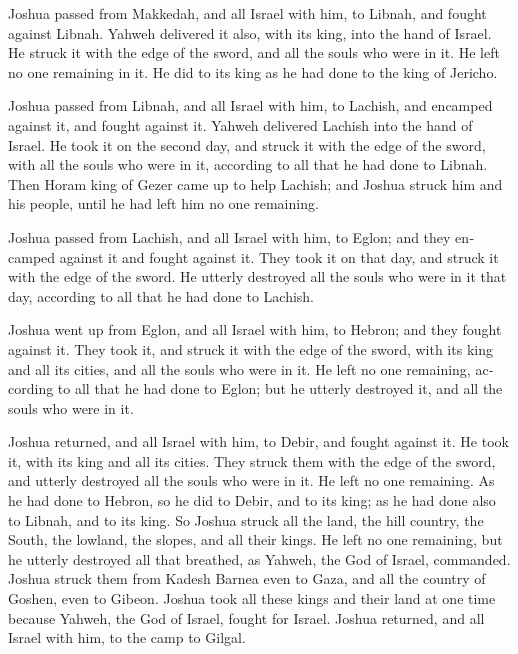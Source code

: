 \begin{paracol}{2}
\begin{otherlanguage}{english}
 Joshua passed from Makkedah, and all Israel with him, to
Libnah, and fought against Libnah.  Yahweh delivered it
also, with its king, into the hand of Israel. He struck it with the edge
of the sword, and all the souls who were in it. He left no one remaining
in it. He did to its king as he had done to the king of Jericho.

 Joshua passed from Libnah, and all Israel with him, to
Lachish, and encamped against it, and fought against it. 
Yahweh delivered Lachish into the hand of Israel. He took it on the
second day, and struck it with the edge of the sword, with all the souls
who were in it, according to all that he had done to Libnah.
 Then Horam king of Gezer came up to help Lachish; and
Joshua struck him and his people, until he had left him no one
remaining.

 Joshua passed from Lachish, and all Israel with him, to
Eglon; and they encamped against it and fought against it.
 They took it on that day, and struck it with the edge of
the sword. He utterly destroyed all the souls who were in it that day,
according to all that he had done to Lachish.

 Joshua went up from Eglon, and all Israel with him, to
Hebron; and they fought against it.  They took it, and
struck it with the edge of the sword, with its king and all its cities,
and all the souls who were in it. He left no one remaining, according to
all that he had done to Eglon; but he utterly destroyed it, and all the
souls who were in it.

 Joshua returned, and all Israel with him, to Debir, and
fought against it.  He took it, with its king and all its
cities. They struck them with the edge of the sword, and utterly
destroyed all the souls who were in it. He left no one remaining. As he
had done to Hebron, so he did to Debir, and to its king; as he had done
also to Libnah, and to its king.  So Joshua struck all
the land, the hill country, the South, the lowland, the slopes, and all
their kings. He left no one remaining, but he utterly destroyed all that
breathed, as Yahweh, the God of Israel, commanded. 
Joshua struck them from Kadesh Barnea even to Gaza, and all the country
of Goshen, even to Gibeon.  Joshua took all these kings
and their land at one time because Yahweh, the God of Israel, fought for
Israel.  Joshua returned, and all Israel with him, to the
camp to Gilgal.


\end{otherlanguage}
\end{paracol}
